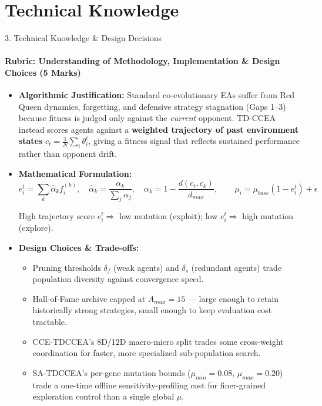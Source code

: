 \documentclass[aspectratio=169, 11pt]{beamer}
\begin{document}





\section{Technical Knowledge}
\begin{frame}{3. Technical Knowledge \& Design Decisions}
    \framesubtitle{Rubric: Understanding of Methodology, Implementation \& Design Choices (5 Marks)}
    
    \scriptsize
    \setlength{\itemsep}{1.5pt}
    \setlength{\parskip}{0pt}
    
    \begin{itemize}
        \item \textbf{Algorithmic Justification:} Standard co-evolutionary EAs suffer from Red Queen dynamics, forgetting, and defensive strategy stagnation (Gaps 1--3) because fitness is judged only against the \emph{current} opponent. TD-CCEA instead scores agents against a \textbf{weighted trajectory of past environment states} $c_t = \frac{1}{N}\sum_i \theta_i^t$, giving a fitness signal that reflects sustained performance rather than opponent drift.

        \item \textbf{Mathematical Formulation:}
        \[
        e_i^t = \sum_k \hat{\alpha}_k f_i^{(k)},\quad
        \hat{\alpha}_k = \frac{\alpha_k}{\sum_j \alpha_j},\quad
        \alpha_k = 1-\frac{d(c_t,c_k)}{d_{max}},
        \qquad
        \mu_i = \mu_{base}(1-e_i^t)+\epsilon
        \]
        \vspace{-6pt}
        
        High trajectory score $e_i^t \Rightarrow$ low mutation (exploit);
        low $e_i^t \Rightarrow$ high mutation (explore).

        \item \textbf{Design Choices \& Trade-offs:}
        \begin{itemize}
            \scriptsize
            \setlength{\itemsep}{1pt}
            \item Pruning thresholds $\delta_f$ (weak agents) and $\delta_s$ (redundant agents) trade population diversity against convergence speed.
            \item Hall-of-Fame archive capped at $A_{max}=15$ --- large enough to retain historically strong strategies, small enough to keep evaluation cost tractable.
            \item CCE-TDCCEA's 8D/12D macro-micro split trades some cross-weight coordination for faster, more specialized sub-population search.
            \item SA-TDCCEA's per-gene mutation bounds ($\mu_{min}=0.08$, $\mu_{max}=0.20$) trade a one-time offline sensitivity-profiling cost for finer-grained exploration control than a single global $\mu$.
        \end{itemize}


\end{itemize}
\end{frame}
\end{document}
